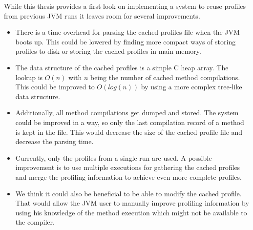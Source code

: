 While this thesis provides a first look on implementing a system to reuse profiles from previous JVM runs it leaves room for several improvements.
\begin{itemize}
  \item There is a time overhead for parsing the cached profiles file when the JVM boots up. This could be lowered by finding more compact ways of storing profiles to disk or storing the cached profiles in main memory.
  \item The data structure of the cached profiles is a simple C heap array. The lookup is $O(n)$ with $n$ being the number of cached method compilations. This could be improved to $O(log(n))$ by using a more complex tree-like data structure.
  \item Additionally, all method compilations get dumped and stored. The system could be improved in a way, so only the last compilation record of a method is kept in the file. This would decrease the size of the cached profile file and decrease the parsing time.
  \item Currently, only the profiles from a single run are used. A possible improvement is to use multiple executions for gathering the cached profiles and merge the profiling information to achieve even more complete profiles.
  \item We think it could also be beneficial to be able to modify the cached profile. That would allow the JVM user to manually improve profiling information by using his knowledge of the method execution which might not be available to the compiler.
\end{itemize}
